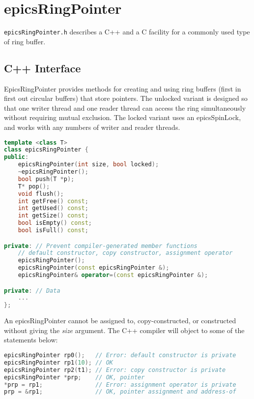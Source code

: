 \section{epicsRingPointer}

\verb|epicsRingPointer.h| describes a C++ and a C facility for a commonly used type of ring buffer.

\subsection{C++ Interface}

EpicsRingPointer provides methods for creating and using ring buffers (first in first out circular buffers) that store pointers.
The unlocked variant is designed so that one writer thread and one reader thread can access the ring simultaneously without requiring mutual exclusion.
The locked variant uses an epicsSpinLock, and works with any numbers of writer and reader threads.

\begin{lstlisting}[language=C++]
template <class T>
class epicsRingPointer {
public:
    epicsRingPointer(int size, bool locked);
    ~epicsRingPointer();
    bool push(T *p);
    T* pop();
    void flush();
    int getFree() const;
    int getUsed() const;
    int getSize() const;
    bool isEmpty() const;
    bool isFull() const;

private: // Prevent compiler-generated member functions
    // default constructor, copy constructor, assignment operator
    epicsRingPointer();
    epicsRingPointer(const epicsRingPointer &);
    epicsRingPointer& operator=(const epicsRingPointer &);

private: // Data
    ...
};
\end{lstlisting}

An epicsRingPointer cannot be assigned to, copy-constructed, or constructed without giving the \emph{size} argument.
The C++ compiler will object to some of the statements below:

\begin{lstlisting}[language=C++]
epicsRingPointer rp0();   // Error: default constructor is private
epicsRingPointer rp1(10); // OK
epicsRingPointer rp2(t1); // Error: copy constructor is private
epicsRingPointer *prp;    // OK, pointer
*prp = rp1;               // Error: assignment operator is private
prp = &rp1;               // OK, pointer assignment and address-of
\end{lstlisting}

